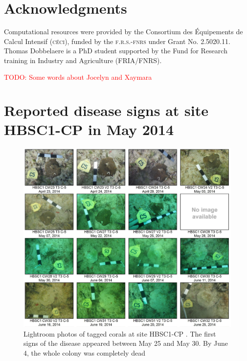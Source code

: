 \documentclass[preprint,12pt,authoryear]{elsarticle}
\newcommand{\todo}[1]{\textcolor{red}{TODO: #1}}
\begin{document}
\section*{Acknowledgments}
Computational resources were provided by the Consortium des \'Equipements de Calcul Intensif (\textsc{c\'eci}), funded by the \textsc{f.r.s.-fnrs} under Grant No. 2.5020.11. Thomas Dobbelaere is a PhD student supported by the Fund for Research training in Industry and Agriculture (\textsc{FRIA}/\textsc{FNRS}).

\todo{Some words about Jocelyn and Xaymara}

 

\newpage
\appendix
\section{Reported disease signs at site HBSC1-CP in May 2014}\label{onset:appendice}
\begin{figure}[h!]
	\centering
	\includegraphics[width=\textwidth]{figures/hbsc1_cp.png}
	\caption{Lightroom photos of tagged corals at site HBSC1-CP \citep{dial2017}. The first signs of the disease appeared between May 25 and May 30. By June 4, the whole colony was completely dead}
\end{figure}
\newpage
\end{document}
